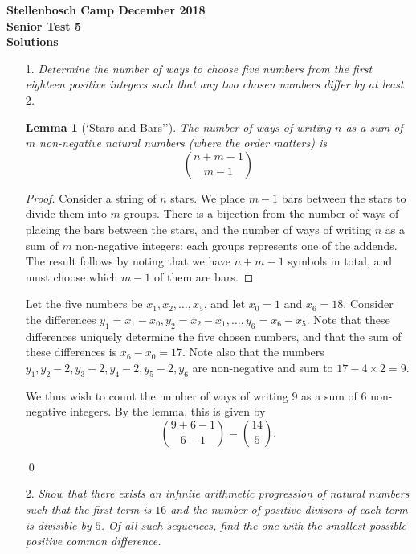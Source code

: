 \documentclass[a4paper, 12pt]{article}
\newtheorem*{lemma}{Lemma}
\begin{document}
\begin{center}
\textbf{Stellenbosch Camp December 2018 \\ Senior Test 5} \\
\textbf{Solutions}
\end{center}
\vspace{5mm}

\begin{enumerate}
    
\item[1.]  \textit{Determine the number of ways to choose five numbers from the first eighteen positive integers such that any two chosen numbers differ by at least $2$.}

\begin{lemma}[`Stars and Bars'']
The number of ways of writing $n$ as a sum of $m$ non-negative natural numbers (where the order matters) is
\[
	\binom{n + m - 1}{m - 1}
\]
\end{lemma}
\begin{proof}
Consider a string of $n$ stars. We place $m - 1$ bars between the stars to divide them into $m$ groups. There is a bijection from the number of ways of placing the bars between the stars, and the number of ways of writing $n$ as a sum of $m$ non-negative integers: each groups represents one of the addends. The result follows by noting that we have $n + m - 1$ symbols in total, and must choose which $m - 1$ of them are bars.
\end{proof}

Let the five numbers be $x_1, x_2, \dots, x_5$, and let $x_0 = 1$ and $x_6 = 18$. Consider the differences $y_1 = x_1 - x_0, y_2 = x_2 - x_1, \dots, y_6 = x_6 - x_5$. Note that these differences uniquely determine the five chosen numbers, and that the sum of these differences is $x_6 - x_0 = 17$. Note also that the numbers $y_1, y_2 - 2, y_3 - 2, y_4 - 2, y_5 - 2, y_6$ are non-negative and sum to $17 - 4 \times 2 = 9$.

We thus wish to count the number of ways of writing $9$ as a sum of $6$ non-negative integers. By the lemma, this is given by
\[
	\binom{9 + 6 - 1}{6 - 1} = \binom{14}{5}.
\]

\qed


\vspace{5mm}
\item[2.]  \textit{Show that there exists an infinite arithmetic progression of natural numbers such that the first term is $16$ and the number of positive divisors of each term is divisible by $5$. Of all such sequences, find the one with the smallest possible positive common difference.}


\end{enumerate}
\end{document}
